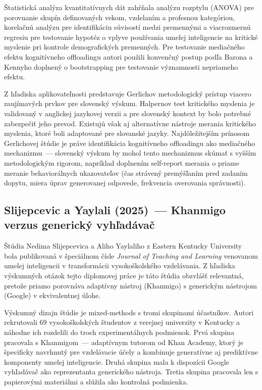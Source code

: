Štatistická analýza kvantitatívnych dát zahŕňala analýzu rozptylu (ANOVA) pre porovnanie skupín definovaných vekom, vzdelaním a profesnou kategóriou, korelačnú analýzu pre identifikáciu súvisostí medzi premennými a viacrozmernú regresiu pre testovanie hypotéz o vplyve používania umelej inteligencie na kritické myslenie pri kontrole demografických premenných. Pre testovanie mediačného efektu kognitívneho offloadingu autori použili konvenčný postup podľa Barona a Kennyho doplnený o bootstrapping pre testovanie významnosti nepriameho efektu.

Z hľadiska aplikovateľnosti predstavuje Gerlichov metodologický prístup viacero zaujímavých prvkov pre slovenský výskum. Halpernov test kritického myslenia je validovaný v anglickej jazykovej verzii a pre slovenský kontext by bolo potrebné zabezpečiť jeho prevod. Existujú však aj alternatívne nástroje merania kritického myslenia, ktoré boli adaptované pre slovanské jazyky. Najdôležitejším prínosom Gerlichovej štúdie je práve identifikácia kognitívneho offloadingu ako mediačného mechanizmu~--- slovenský výskum by mohol tento mechanizmus skúmať s vyšším metodologickým rigorom, napríklad doplnením self-report merania o priame meranie behaviorálnych ukazovateľov (čas strávený premýšľaním pred zadaním dopytu, miera úprav generovanej odpovede, frekvencia overovania správnosti).


\subsection{Slijepcevic a Yaylali (2025)~--- Khanmigo verzus generický vyhľadávač}
\label{subsec:slijepcevic}

Štúdia Nedima Slijepcevica a Aliho Yaylaliho z Eastern Kentucky University~\cite{slijepcevic2025khanmigo} bola publikovaná v špeciálnom čísle \textit{Journal of Teaching and Learning} venovanom umelej inteligencii v transformácii vysokoškolského vzdelávania. Z hľadiska výskumných otázok tejto diplomovej práce je táto štúdia obzvlášť relevantná, pretože priamo porovnáva adaptívny nástroj (Khanmigo) s generickým nástrojom (Google) v ekvivalentnej úlohe.

Výskumný dizajn štúdie je mixed-methods s tromi skupinami účastníkov. Autori rekrutovali 69 vysokoškolských študentov z verejnej univerzity v Kentucky a náhodne ich rozdelili do troch experimentálnych podmienok. Prvá skupina pracovala s Khanmigom~--- adaptívnym tutorom od Khan Academy, ktorý je špecificky navrhnutý pre vzdelávacie účely a kombinuje generatívne aj prediktívne komponenty umelej inteligencie. Druhá skupina mala k dispozícii Google vyhľadávač ako reprezentanta generického nástroja. Tretia skupina pracovala len s papierovými materiálmi a slúžila ako kontrolná podmienka.

